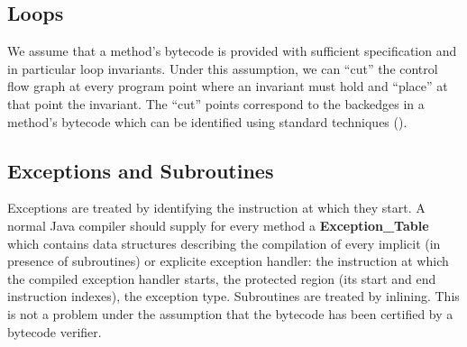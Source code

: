 \subsection{Loops}
 We assume that a method's bytecode is provided with sufficient specification and in particular loop invariants. Under this assumption, we can ``cut'' the control flow graph at every program point where an invariant must hold and ``place'' at that point the invariant. 
The ``cut'' points correspond to the backedges in a method's bytecode which can be identified using standard techniques (\cite{ARUCom1986}).


     
\subsection{Exceptions and Subroutines}

Exceptions are treated by identifying the instruction at which they start. A normal Java compiler should supply for every method
a \textbf{Exception\_Table} which contains data structures describing the compilation of every implicit (in presence of subroutines)
 or explicite exception handler: the instruction at which the compiled exception handler starts, the protected region (its start and end instruction indexes), the exception type.
Subroutines are treated by inlining. This is not a problem under the assumption that the bytecode has been certified by a bytecode verifier.
